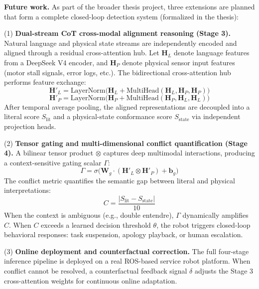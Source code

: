 \documentclass[conference]{IEEEtran}
\begin{document}
\textbf{Future work.}
As part of the broader thesis project, three extensions are planned that form
a complete closed-loop detection system (formalized in the thesis):

(1) \textbf{Dual-stream CoT cross-modal alignment reasoning (Stage 3).}
Natural language and physical state streams are independently encoded and aligned
through a residual cross-attention hub.
Let $\mathbf{H}_L$ denote language features from a DeepSeek V4 encoder, and
$\mathbf{H}_P$ denote physical sensor input features (motor stall signals, error
logs, etc.). The bidirectional cross-attention hub performs feature exchange:
\begin{equation}
\mathbf{H}'_L = \text{LayerNorm}\big(\mathbf{H}_L + \text{MultiHead}(\mathbf{H}_L, \mathbf{H}_P, \mathbf{H}_P)\big)
\end{equation}
\begin{equation}
\mathbf{H}'_P = \text{LayerNorm}\big(\mathbf{H}_P + \text{MultiHead}(\mathbf{H}_P, \mathbf{H}_L, \mathbf{H}_L)\big)
\end{equation}
After temporal average pooling, the aligned representations are decoupled into
a literal score $S_{\text{lit}}$ and a physical-state conformance score
$S_{\text{state}}$ via independent projection heads.

(2) \textbf{Tensor gating and multi-dimensional conflict quantification (Stage 4).}
A bilinear tensor product $\otimes$ captures deep multimodal interactions,
producing a context-sensitive gating scalar $\Gamma$:
\begin{equation}
\Gamma = \sigma\big(\mathbf{W}_g \cdot (\mathbf{H}'_L \otimes \mathbf{H}'_P) + \mathbf{b}_g\big)
\end{equation}
The conflict metric quantifies the semantic gap between literal and physical
interpretations:
\begin{equation}
C = \frac{|S_{\text{lit}} - S_{\text{state}}|}{10}
\end{equation}
When the context is ambiguous (e.g., double entendre), $\Gamma$ dynamically
amplifies $C$. When $C$ exceeds a learned decision threshold $\theta$, the
robot triggers closed-loop behavioral responses: task suspension, apology
playback, or human escalation.

(3) \textbf{Online deployment and counterfactual correction.}
The full four-stage inference pipeline is deployed on a real ROS-based service
robot platform. When conflict cannot be resolved, a counterfactual feedback
signal $\delta$ adjusts the Stage 3 cross-attention weights for continuous
online adaptation.
\end{document}
